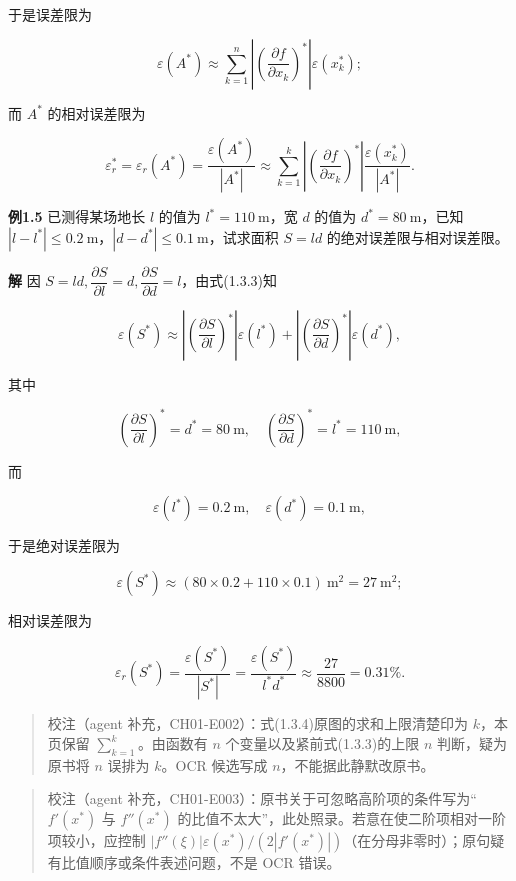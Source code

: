 于是误差限为

\[
\varepsilon(A^*)\approx\sum_{k=1}^{n}\left|\left(\frac{\partial f}{\partial x_k}\right)^*\right|\varepsilon(x_k^*);
\tag{1.3.3}
\]

而 \(A^*\) 的相对误差限为

\[
\varepsilon_r^*=\varepsilon_r(A^*)=\frac{\varepsilon(A^*)}{|A^*|}\approx\sum_{k=1}^{k}\left|\left(\frac{\partial f}{\partial x_k}\right)^*\right|\frac{\varepsilon(x_k^*)}{|A^*|}.
\tag{1.3.4}
\]

\textbf{例1.5} 已测得某场地长 \(l\) 的值为 \(l^*=110\ \mathrm{m}\)，宽 \(d\) 的值为 \(d^*=80\ \mathrm{m}\)，已知 \(|l-l^*|\leqslant 0.2\ \mathrm{m}\)，\(|d-d^*|\leqslant 0.1\ \mathrm{m}\)，试求面积 \(S=ld\) 的绝对误差限与相对误差限。

\textbf{解} 因 \(S=ld,\dfrac{\partial S}{\partial l}=d,\dfrac{\partial S}{\partial d}=l\)，由式(1.3.3)知

\[
\varepsilon(S^*)\approx\left|\left(\frac{\partial S}{\partial l}\right)^*\right|\varepsilon(l^*)+\left|\left(\frac{\partial S}{\partial d}\right)^*\right|\varepsilon(d^*),
\]

其中

\[
\left(\frac{\partial S}{\partial l}\right)^*=d^*=80\ \mathrm{m},\quad
\left(\frac{\partial S}{\partial d}\right)^*=l^*=110\ \mathrm{m},
\]

而

\[
\varepsilon(l^*)=0.2\ \mathrm{m},\quad\varepsilon(d^*)=0.1\ \mathrm{m},
\]

于是绝对误差限为

\[
\varepsilon(S^*)\approx(80\times0.2+110\times0.1)\ \mathrm{m}^2=27\ \mathrm{m}^2;
\]

相对误差限为

\[
\varepsilon_r(S^*)=\frac{\varepsilon(S^*)}{|S^*|}=\frac{\varepsilon(S^*)}{l^*d^*}\approx\frac{27}{8800}=0.31\%.
\]

\begin{quote}
校注（agent 补充，CH01-E002）：式(1.3.4)原图的求和上限清楚印为 \(k\)，本页保留 \(\sum_{k=1}^{k}\)。由函数有 \(n\) 个变量以及紧前式(1.3.3)的上限 \(n\) 判断，疑为原书将 \(n\) 误排为 \(k\)。OCR 候选写成 \(n\)，不能据此静默改原书。
\end{quote}

\begin{quote}
校注（agent 补充，CH01-E003）：原书关于可忽略高阶项的条件写为``\(f'(x^*)\) 与 \(f''(x^*)\) 的比值不太大''，此处照录。若意在使二阶项相对一阶项较小，应控制 \(|f''(\xi)|\varepsilon(x^*)/(2|f'(x^*)|)\)（在分母非零时）；原句疑有比值顺序或条件表述问题，不是 OCR 错误。
\end{quote}

